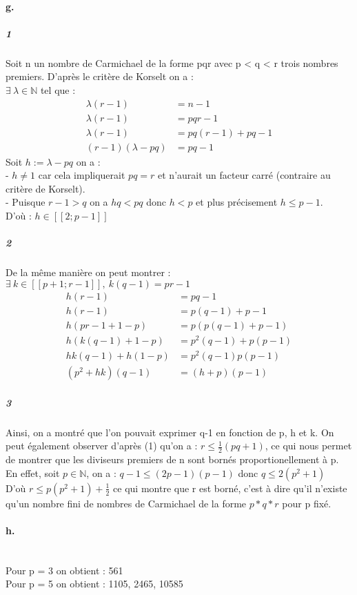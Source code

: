 \documentclass[french]{article}
\begin{document}
\paragraph{g.}\subparagraph{1} Soit n un nombre de Carmichael de la forme pqr avec p < q < r trois nombres premiers. D'après le critère de Korselt on a :\\
$\exists \:\lambda \in \mathbb{N}$ tel que :
\begin{align*}
    \lambda(r-1)&=n-1\\
    \lambda(r-1)&=pqr-1\\
    \lambda(r-1)&=pq(r-1)+pq-1\\
    (r-1)(\lambda-pq)&=pq-1
\end{align*}
Soit $h := \lambda - pq$ on a :\\
 - $h \ne 1$ car cela impliquerait $pq=r$ et n'aurait un facteur carré (contraire au critère de Korselt).\\
 - Puisque $r-1>q$ on a $hq<pq$ donc $h<p$ et plus précisement $h \leq p-1$.\\
D'où : $h \in [\![2; p-1]\!]$
\subparagraph{2} De la même manière on peut montrer : $\exists \:k \in [\![p+1; r-1]\!], \: k(q-1)=pr-1$
\begin{align*}
    h(r-1)&=pq-1\\h(r-1)&=p(q-1)+p-1\\h(pr -1 +1 -p)&=p(p(q-1)+p-1)\\
    h(k(q-1) +1 -p)&=p^2(q-1)+p(p-1)\\
    hk(q-1)+h(1-p)&=p^2(q-1)p(p-1)\\
    (p^2+hk)(q-1)&=(h+p)(p-1)
\end{align*}
\subparagraph{3} Ainsi, on a montré que l'on pouvait exprimer q-1 en fonction de p, h et k. On peut également observer d'après (1) qu'on a : $r \leq \frac{1}{2}(pq + 1)$, ce qui nous permet de montrer que les diviseurs premiers de n sont bornés proportionellement à p.\\
En effet, soit $p \in \mathbb{N}$, on a : $q - 1 \leq (2p - 1)(p-1)$ donc $q\leq 2(p^2 + 1)$ \\ D'où $r \leq p(p^2 + 1) + \frac{1}{2}$ ce qui montre que r est borné, c'est à dire qu'il n'existe qu'un nombre fini de nombres de
Carmichael de la forme $p*q*r$ pour p fixé.
\paragraph{h.}  \*\\ Pour p = 3 on obtient : 561 \\ Pour p = 5 on obtient : 1105, 2465, 10585
\end{document}
